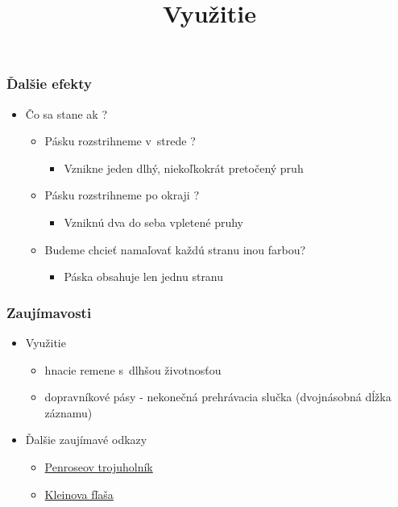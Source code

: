 \documentclass{beamer}
\begin{document}
\begin{frame}
\frametitle{Ďalšie efekty}
\centering
\begin{itemize}
\item Čo sa stane ak ? 
\bigskip
\begin{itemize}
\item Pásku rozstrihneme v~strede ? 
\begin{itemize}
\item  Vznikne jeden dlhý, niekoľkokrát pretočený pruh
\medskip
\end{itemize}
\item Pásku rozstrihneme po okraji ? 
\begin{itemize}
\item Vzniknú dva do seba vpletené pruhy
\medskip
\end{itemize}
\item Budeme chcieť namaľovať každú stranu inou farbou? 
\begin{itemize}
\item Páska obsahuje len jednu stranu
\end{itemize}
\end{itemize}
\end{itemize}
\end{frame} 


\begin{frame}
\frametitle{Zaujímavosti}
\title{Využitie}
\begin{itemize}
\item Využitie
\begin{itemize}
\item hnacie remene s~dlhšou životnosťou
\item dopravníkové pásy - nekonečná prehrávacia slučka (dvojnásobná dĺžka záznamu)
\end{itemize}
\end{itemize}

\begin{itemize}
\item{Ďalšie zaujímavé odkazy}
\begin{itemize}
\item \href{https://cs.wikipedia.org/wiki/Penrose\%C5\%AFv_troj\%C3\%BAheln\%C3\%ADk}{Penroseov trojuholník}
\item \href{https://cs.wikipedia.org/wiki/Kleinova_l\%C3\%A1hev}{Kleinova fľaša}
\end{itemize}
\end{itemize}
\end{frame} 
\end{document}
